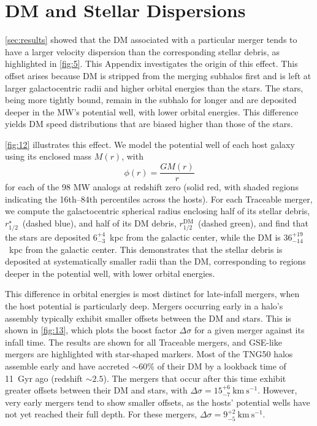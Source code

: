 \documentclass[twocolumn,tighten,twocolappendix]{aastex701}
\newcommand{\kms}{\ensuremath{\text{km}~\text{s}^{-1}}}
\newcommand{\osim}{\mathord{\sim}}
\begin{document}
\section{DM and Stellar Dispersions}
\label{appendix:boost}
\setcounter{equation}{0}
\renewcommand{\theequation}{B\arabic{equation}}

\autoref{sec:results} showed that the DM associated with a particular merger tends to have a larger velocity dispersion than the corresponding stellar debris, as highlighted in \autoref{fig:5}. This Appendix investigates the origin of this effect. This offset arises because DM is stripped from the merging subhalos first and is left at larger galactocentric radii and higher orbital energies than the stars. The stars, being more tightly bound, remain in the subhalo for longer and are deposited deeper in the MW's potential well, with lower orbital energies. This difference yields DM speed distributions that are biased higher than those of the stars. 

\autoref{fig:12} illustrates this effect. We model the potential well of each host galaxy using its enclosed mass $M(r)$, with 
\begin{equation}
\phi(r) = \frac{GM(r)}{r}
\end{equation}
for each of the 98 MW analogs at redshift zero (solid red, with shaded regions indicating the 16th--84th percentiles across the hosts). For each Traceable merger, we compute the galactocentric spherical radius enclosing half of its stellar debris, $r_{1/2}^\star$~(dashed blue), and half of its DM debris, $r_{1/2}^\mathrm{DM}$~(dashed green), and find that the stars are deposited $6^{+4}_{-3}$~kpc from the galactic center, while the DM is $36^{+19}_{-14}$~kpc from the galactic center. This demonstrates that the stellar debris is deposited at systematically smaller radii than the DM, corresponding to regions deeper in the potential well, with lower orbital energies.

This difference in orbital energies is most distinct for late-infall mergers, when the host potential is particularly deep. Mergers occurring early in a halo's assembly typically exhibit smaller offsets between the DM and stars. This is shown in  \autoref{fig:13}, which plots the boost factor $\Delta\sigma$ for a given merger against its infall time.  The results are shown for all Traceable mergers, and  GSE-like mergers are highlighted with star-shaped markers. Most of the TNG50 halos assemble early and have accreted $\osim60\%$ of their DM by a lookback time of 11~Gyr ago (redshift $\sim 2.5$). The mergers that occur after this time exhibit greater offsets between their DM and stars, with $\Delta\sigma = 15^{+6}_{-7}~\kms{}$. However, very early mergers tend to show smaller offsets, as the hosts' potential wells have not yet reached their full depth. For these mergers, $\Delta\sigma = 9^{+2}_{-5}~\kms{}$. 
\end{document}
